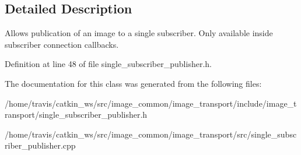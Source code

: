 \subsection{Detailed Description}
Allows publication of an image to a single subscriber. Only available inside subscriber connection callbacks. 

Definition at line 48 of file single\-\_\-subscriber\-\_\-publisher.\-h.



The documentation for this class was generated from the following files\-:\begin{DoxyCompactItemize}
\item 
/home/travis/catkin\-\_\-ws/src/image\-\_\-common/image\-\_\-transport/include/image\-\_\-transport/single\-\_\-subscriber\-\_\-publisher.\-h\item 
/home/travis/catkin\-\_\-ws/src/image\-\_\-common/image\-\_\-transport/src/single\-\_\-subscriber\-\_\-publisher.\-cpp\end{DoxyCompactItemize}
